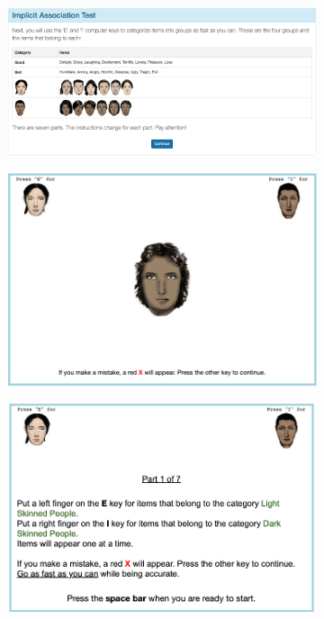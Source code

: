 \documentclass[12pt,english]{article}
\begin{document}
\begin{appendices}
\begin{figure}[!htb]
\centering
\caption{Examples of an Implicit Association Test}
\label{fig:iatexamples}
\begin{subfigure}{.48\textwidth}
\centering
\includegraphics[width=.9\linewidth]{figure/iatexample1.png}
\end{subfigure}
\centering
\begin{subfigure}{.48\textwidth}
\centering
\includegraphics[width=.9\linewidth]{figure/iatexample2.png}
\end{subfigure}
\begin{subfigure}{.48\textwidth}
\centering
\includegraphics[width=.9\linewidth]{figure/iatexample3.png}

\end{subfigure}
\end{figure}
\end{appendices}
\end{document}

